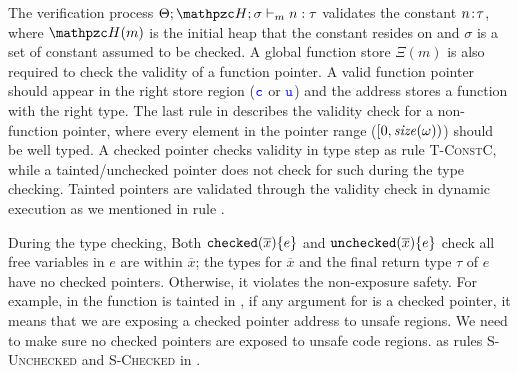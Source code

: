 The verification process $\Theta;\heap;\sigma \vdash_m n : \tau$
validates the constant ${n}\!:\!{\tau}$, 
where $\heap(m)$ is the initial heap that the constant resides on and
$\sigma$ is a set of constant assumed to be checked.
A global function store $\Xi(m)$ is also required to check the validity of a function pointer.
A valid function pointer should appear in the right store region ($\textcolor{blue}{\texttt{c}}$ or $\textcolor{blue}{\texttt{u}}$)
and the address stores a function with the right type.
The last rule in  describes the validity check for a non-function pointer, 
where every element in the pointer range ($[0,\mathit{size}(\omega))$) should be well
typed.
A checked pointer checks validity in type step as rule \textsc{T-ConstC},
while a tainted/unchecked pointer does not check for such during the type checking.
Tainted pointers are validated through the validity check in dynamic execution as we mentioned in rule .

%
During the type checking,
Both $\mathtt{checked}({\overline{x}}){\{e\}}$ and $\mathtt{unchecked}({\overline{x}})\{e\}$
check all free variables in $e$ are within $\overline{x}$;
the types for $\overline{x}$ and the final return type $\tau$ of $e$ have no checked pointers.
Otherwise, it violates the non-exposure safety.
For example,  in the  function is tainted in ,
if any argument for  is a checked pointer, 
it means that we are exposing a checked pointer address to unsafe regions.
% 
% 
% 
We need to make sure no checked pointers are  exposed to unsafe code regions.
as rules \textsc{S-Unchecked} and \textsc{S-Checked} in .
% 
% 

